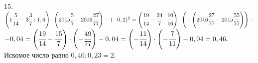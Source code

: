 15. $\left(1\cfrac{5}{14}-3\cfrac{3}{7}:1,6\right)\cdot\left(2015\cfrac{5}{7}-2016\cfrac{27}{77}\right)-
(-0,2)^2=\left(\cfrac{19}{14}-\cfrac{24}{7}\cdot\cfrac{10}{16}\right)\cdot\left(-\left(2016\cfrac{27}{77}-2015\cfrac{55}{77}\right)\right)-$\\
$-0,04=\left(\cfrac{19}{14}-\cfrac{15}{7}\right)\cdot\left(-\cfrac{49}{77}\right)-0,04=\left(-\cfrac{11}{14}\right)\cdot\left(-\cfrac{7}{11}\right)-0,04=
0,46.$ Искомое число равно $0,46:0,23=2.$\\
